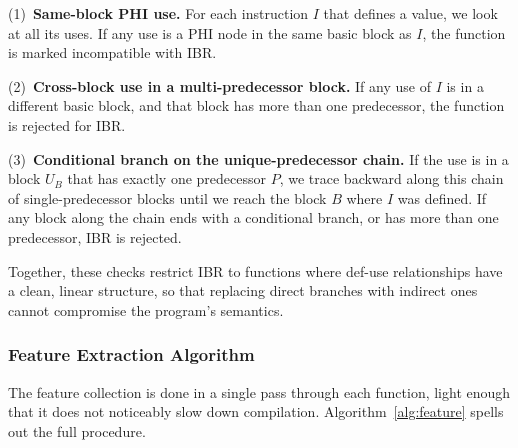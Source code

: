 \documentclass[pdflatex,sn-mathphys-num]{sn-jnl}
\theoremstyle{thmstyleone}%
\theoremstyle{thmstyletwo}%
\theoremstyle{thmstylethree}%
\begin{document}
(1)~\textbf{Same-block PHI use.} For each instruction $I$ that defines a value, we
look at all its uses. If any use is a PHI node in the same basic block as $I$, the
function is marked incompatible with IBR.

(2)~\textbf{Cross-block use in a multi-predecessor block.} If any use of $I$ is in a
different basic block, and that block has more than one predecessor, the function is
rejected for IBR.

(3)~\textbf{Conditional branch on the unique-predecessor chain.} If the use is in a
block $U_B$ that has exactly one predecessor $P$, we trace backward along this chain
of single-predecessor blocks until we reach the block $B$ where $I$ was defined. If
any block along the chain ends with a conditional branch, or has more than one
predecessor, IBR is rejected.

Together, these checks restrict IBR to functions where def-use relationships have a
clean, linear structure, so that replacing direct branches with indirect ones cannot
compromise the program's semantics.

\subsubsection{Feature Extraction Algorithm}

The feature collection is done in a single pass through each function, light enough
that it does not noticeably slow down compilation. Algorithm~\ref{alg:feature} spells
out the full procedure.
\end{document}
